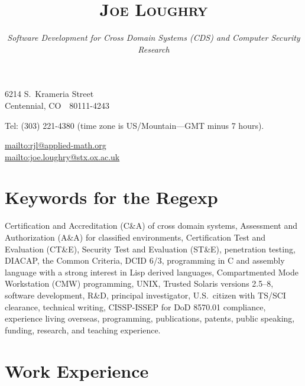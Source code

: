 \documentclass[letterpaper]{article}
\date{}
\title{\textsc{Joe Loughry}\vspace{-2mm}}
\author{\vspace{-3mm}\emph{\spaceskip=0.825\fontdimen2\font Software Development 
	for Cross Domain Systems (CDS) and Computer Security Research}
}
\begin{document}
\maketitle

\vspace*{-12mm}
\hfill 6214 S.\ Krameria Street \\
\hfill Centennial, CO\ \ 80111-4243

Tel: (303) 221-4380 (time zone is US/Mountain---GMT minus 7 hours).

\url{mailto:rjl@applied-math.org} \\
\url{mailto:joe.loughry@stx.ox.ac.uk}

\section*{Keywords for the Regexp}

Certification and Accreditation (C\&A) of cross domain systems,
Assessment and Authorization (A\&A) for classified environments,
Certification Test and Evaluation (CT\&E),
Security Test and Evaluation (ST\&E),
penetration testing,
DIACAP,
the Common Criteria,
DCID 6/3,
programming in C and assembly language with a strong interest in Lisp derived languages,
Compartmented Mode Workstation (CMW) programming,
UNIX,
Trusted Solaris versions 2.5--8,
software development,
R\&D,
principal investigator,
U.S.\ citizen with TS/SCI clearance,
technical writing,
CISSP-ISSEP for DoD 8570.01 compliance,
experience living overseas,
programming,
publications,
patents,
public speaking,
funding,
research,
and teaching experience.

\section*{Work Experience} %
\end{document}

